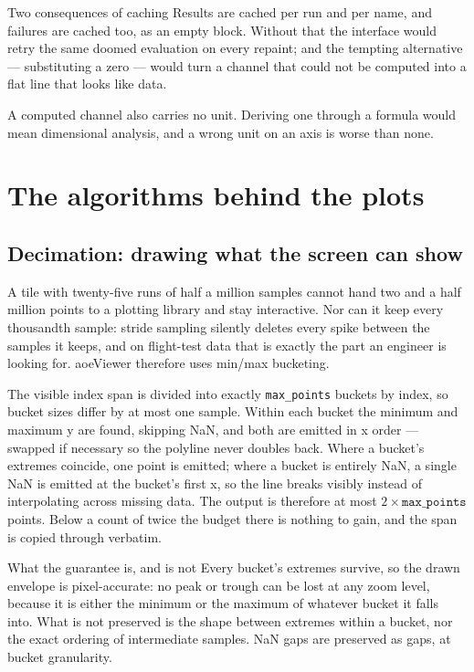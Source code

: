 \documentclass[11pt,a4paper,oneside]{report}
\newcommand{\code}[1]{\texttt{#1}}
\begin{document}
\begin{aoenote}{Two consequences of caching}
Results are cached per run and per name, and failures are cached too, as an
empty block. Without that the interface would retry the same doomed evaluation on
every repaint; and the tempting alternative --- substituting a zero --- would
turn a channel that could not be computed into a flat line that looks like data.

A computed channel also carries no unit. Deriving one through a formula would
mean dimensional analysis, and a wrong unit on an axis is worse than none.
\end{aoenote}

\chapter{The algorithms behind the plots}
\label{ch:algorithms}

\section{Decimation: drawing what the screen can show}

A tile with twenty-five runs of half a million samples cannot hand two and a
half million points to a plotting library and stay interactive. Nor can it keep
every thousandth sample: stride sampling silently deletes every spike between
the samples it keeps, and on flight-test data that is exactly the part an
engineer is looking for. aoeViewer therefore uses min/max bucketing.

The visible index span is divided into exactly \code{max\_points} buckets by
index, so bucket sizes differ by at most one sample. Within each bucket the
minimum and maximum y are found, skipping NaN, and both are emitted in x order
--- swapped if necessary so the polyline never doubles back. Where a bucket's
extremes coincide, one point is emitted; where a bucket is entirely NaN, a
single NaN is emitted at the bucket's first x, so the line breaks visibly
instead of interpolating across missing data. The output is therefore at most
$2 \times \code{max\_points}$ points. Below a count of twice the budget there is
nothing to gain, and the span is copied through verbatim.

\begin{aoenote}{What the guarantee is, and is not}
Every bucket's extremes survive, so the drawn envelope is pixel-accurate: no
peak or trough can be lost at any zoom level, because it is either the minimum
or the maximum of whatever bucket it falls into. What is not preserved is the
shape between extremes within a bucket, nor the exact ordering of intermediate
samples. NaN gaps are preserved as gaps, at bucket granularity.
\end{aoenote}
\end{document}
